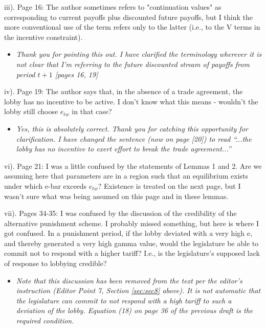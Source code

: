 \documentclass[12pt]{article}
\begin{document}
iii). Page 16: The author sometimes refers to "continuation values" as corresponding to current payoffs plus discounted future payoffs, but I think the more conventional use of the term refers only to the latter (i.e., to the V terms in the incentive constraint).
\begin{itemize}
\renewcommand\labelitemi{-}
	\item \textit{Thank you for pointing this out. I have clarified the terminology wherever it is not clear that I'm referring to the future discounted stream of payoffs from period $t+1$ [pages 16, 19]}
\end{itemize}

iv). Page 19: The author says that, in the absence of a trade agreement, the lobby has no incentive to be active. I don't know what this means - wouldn't the lobby still choose $e_{tw}$ in that case?
\begin{itemize}
\renewcommand\labelitemi{-}
	\item \textit{Yes, this is absolutely correct. Thank you for catching this opportunity for clarification. I have changed the sentence (now on page [20]) to read ``...the lobby has no incentive to exert effort to break the trade agreement...''}
\end{itemize}

vi). Page 21: I was a little confused by the statements of Lemmas 1 and 2. Are we assuming here that parameters are in a region such that an equilibrium exists under which e-bar exceeds $e_{tw}$? Existence is treated on the next page, but I wasn't sure what was being assumed on this page and in these lemmas.

vii). Pages 34-35: I was confused by the discussion of the credibility of the alternative punishment scheme. I probably missed something, but here is where I got confused. In a punishment period, if the lobby deviated with a very high e, and thereby generated a very high gamma value, would the legislature be able to commit not to respond with a higher tariff? I.e., is the legislature's supposed lack of response to lobbying credible?
\begin{itemize}
\renewcommand\labelitemi{-}
	\item \textit{Note that this discussion has been removed from the text per the editor's instruction (Editor Point 7, Section \ref{sec:sec8} above). It is not automatic that the legislature can commit to not respond with a high tariff to such a deviation of the lobby. Equation (18) on page 36 of the previous draft is the required condition.}
\end{itemize}
\end{document}
